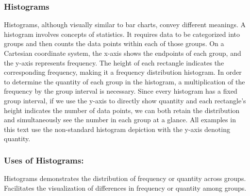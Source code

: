 \documentclass{article}\usepackage[]{graphicx}\usepackage[]{xcolor}
\begin{document}
\subsubsection{Histograms}
Histograms, although visually similar to bar charts, convey different meanings. A histogram involves concepts of statistics. It requires data to be categorized into groups and then counts the data points within each of those groups. On a Cartesian coordinate system, the x-axis shows the endpoints of each group, and the y-axis represents frequency. The height of each rectangle indicates the corresponding frequency, making it a frequency distribution histogram. In order to determine the quantity of each group in the histogram, a multiplication of the frequency by the group interval is necessary. Since every histogram has a fixed group interval, if we use the y-axis to directly show quantity and each rectangle's height indicates the number of data points, we can both retain the distribution and simultaneously see the number in each group at a glance. All examples in this text use the non-standard histogram depiction with the y-axis denoting quantity.

\subsubsection{Uses of Histograms:}
Histograms demonstrates the distribution of frequency or quantity across groups.
Facilitates the visualization of differences in frequency or quantity among groups.
\end{document}
